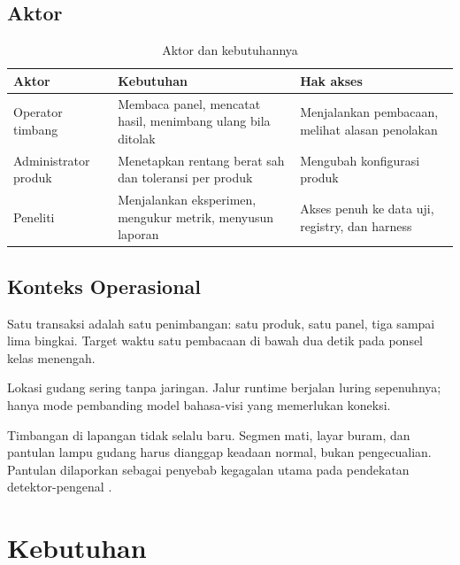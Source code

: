 \documentclass[12pt,a4paper,oneside]{report}
\newcommand{\parencite}[1]{\citep{#1}}
\begin{document}
\section{Aktor}

\begin{table}[H]
\caption{Aktor dan kebutuhannya}
\label{tab:aktor}
\begin{tabularx}{\textwidth}{@{}L{2.6cm} L{5.0cm} X@{}}
\toprule
\textbf{Aktor} & \textbf{Kebutuhan} & \textbf{Hak akses} \\
\midrule
Operator timbang & Membaca panel, mencatat hasil, menimbang ulang bila ditolak & Menjalankan pembacaan, melihat alasan penolakan \\
Administrator produk & Menetapkan rentang berat sah dan toleransi per produk & Mengubah konfigurasi produk \\
Peneliti & Menjalankan eksperimen, mengukur metrik, menyusun laporan & Akses penuh ke data uji, registry, dan harness \\
\bottomrule
\end{tabularx}
\end{table}

\section{Konteks Operasional}

\begin{poin}
  \item Satu transaksi adalah satu penimbangan: satu produk, satu panel, tiga
        sampai lima bingkai. Target waktu satu pembacaan di bawah dua detik pada
        ponsel kelas menengah.
  \item Lokasi gudang sering tanpa jaringan. Jalur runtime berjalan luring
        sepenuhnya; hanya mode pembanding model bahasa-visi yang memerlukan
        koneksi.
  \item Timbangan di lapangan tidak selalu baru. Segmen mati, layar buram, dan
        pantulan lampu gudang harus dianggap keadaan normal, bukan pengecualian.
        Pantulan dilaporkan sebagai penyebab kegagalan utama pada pendekatan
        detektor-pengenal \parencite{low2024detecting}.
\end{poin}

\chapter{Kebutuhan}
\end{document}
